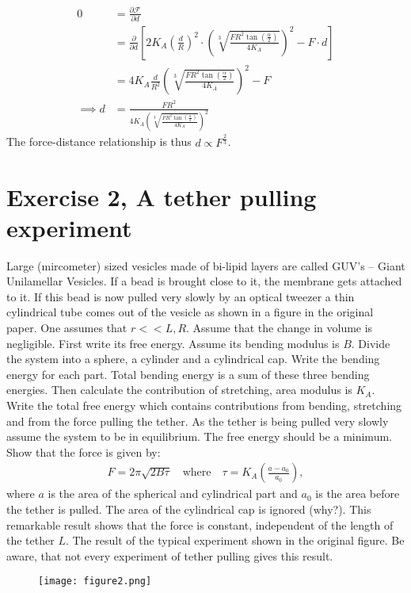 \documentclass[a4paper]{article}
\newcommand{\F}{\mathcal{F}}
\begin{document}
\begin{align*}
    0 &= \frac{\partial \F}{\partial d}\\
    &= \frac{\partial}{\partial d}\left[2K_A\left(\frac{d}{R}\right)^2\cdot \left(\sqrt[3]{\frac{FR^2\tan{\left(\frac{\alpha}{2}\right)}}{4K_A}}\right)^2 - F\cdot d\right]\\
    &= 4K_A\frac{d}{R^2}\left(\sqrt[3]{\frac{FR^2\tan{\left(\frac{\alpha}{2}\right)}}{4K_A}}\right)^2 - F\\
    \implies d &=  \frac{FR^2}{4K_A\left(\sqrt[3]{\frac{FR^2\tan{\left(\frac{\alpha}{2}\right)}}{4K_A}}\right)^2}
\end{align*}The force-distance relationship is thus $d \propto F^{\frac{2}{3}}$.


\section*{Exercise 2, A tether pulling experiment}
Large (mircometer) sized vesicles made of bi-lipid layers are called GUV's -- Giant Unilamellar Vesicles. If a bead is brought close to it, the membrane gets attached to it.
If this bead is now pulled very slowly by an optical tweezer a thin cylindrical tube comes out of the vesicle as shown in a figure in the original paper. One assumes that $r<< L, R$.
Assume that the change in volume is negligible. First write its free energy. Assume its bending modulus is $B$. Divide the system into a sphere, a cylinder and a cylindrical cap. 
Write the bending energy for each part. Total bending energy is a sum of these three bending energies. Then calculate the contribution of stretching, area modulus is $K_A$.
Write the total free energy which contains contributions from bending, stretching and from the force pulling the tether.
As the tether is being pulled very slowly assume the system to be in equilibrium. The free energy should be a minimum. Show that the force is given by:
\begin{align*}
    F = 2\pi\sqrt{2B \tau}\quad \text{where} \quad \tau = K_A \left(\frac{a - a_0}{a_0}\right),
\end{align*}where $a$ is the area of the spherical and cylindrical part and $a_0$ is the area before the tether is pulled. The area of the cylindrical cap is ignored (why?). 
This remarkable result shows that the force is constant, independent of the length of the tether $L$. The result of the typical experiment shown in the original figure.
Be aware, that not every experiment of tether pulling gives this result.
\begin{figure}[H]
    \centering
    \texttt{[image: figure2.png]}
\end{figure}
\end{document}
